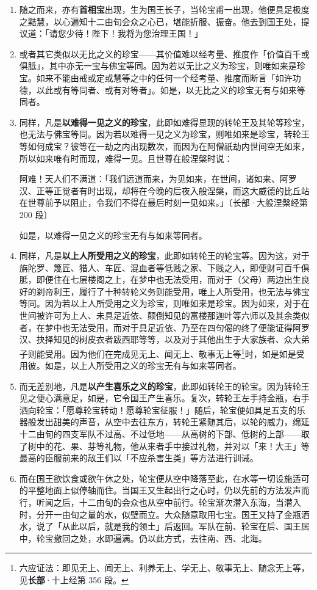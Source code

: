 \begin{enumerate}
\item 随之而来，亦有\textbf{首相宝}出现，生为国王长子，当轮宝甫一出现，他便具足极度之黠慧，以心遍知十二由旬会众之心已，堪能折服、振奋。他去到国王处，提议道：「请您少待！陛下！我将为您治理王国！」
\item 或者其它类似以无比之义的珍宝——其价值难以经考量、推度作「价值百千或俱胝」，其中亦无一宝与佛宝等同。因为若以无比之义为珍宝，则唯如来是珍宝。如来不能由戒或定或慧等之中的任何一个经考量、推度而断言「如许功德，以此或有等同者、或有对等者」。如是，以无比之义的珍宝无有与如来等同者。
\item 同样，凡是\textbf{以难得一见之义的珍宝}，此即如难得显现的转轮王及其轮等珍宝，也无法与佛宝等同。因为若以难得一见之义为珍宝，则唯如来是珍宝，转轮王等如何成宝？彼等在一劫之内出现数次，而因为在阿僧祇劫内世间空无如来，所以如来唯有时而现，难得一见。且世尊在般涅槃时说：\begin{quoting}阿难！天人们不满道：「我们远道而来，为见如来，在世间，诸如来、阿罗汉、正等正觉者有时出现，却将在今晚的后夜入般涅槃，而这大威德的比丘站在世尊前予以阻止，令我们不得在最后时刻一见如来。」{\bluefootnotesize 〔长部·大般涅槃经第 200 段〕}\end{quoting}如是，以难得一见之义的珍宝无有与如来等同者。
\item 同样，凡是\textbf{以上人所受用之义的珍宝}，此即如转轮王的轮宝等。因为这，对于旃陀罗、篾匠、猎人、车匠、混血者等低贱之家、下贱之人，即便财可百千俱胝，即便住在七层楼阁之上，在梦中也无法受用，而对于（父母）两边出生良好的刹帝利王，履行了十种转轮义务则能受用，唯上人所受用，也无法与佛宝等同。因为若以上人所受用之义为珍宝，则唯如来是珍宝。因为如来，对于在世间被许可为上人、未具足近依、颠倒知见的富楼那迦叶等六师以及其余类似者，在梦中也无法受用，而对于具足近依、乃至在四句偈的终了便能证得阿罗汉、抉择知见的树皮衣者跋西耶等等，以及对于其他出生于大家族者、众大弟子则能受用。因为他们在完成见无上、闻无上、敬事无上等\footnote{六应证法：即见无上、闻无上、利养无上、学无上、敬事无上、随念无上等，见\textbf{长部}·十上经第 356 段。}时，如是如是受用彼。如是，以上人所受用之义的珍宝无有与如来等同者。
\item 而无差别地，凡是\textbf{以产生喜乐之义的珍宝}，此即如转轮王的轮宝。因为转轮王见之便心满意足，如是，它令国王产生喜乐。复次，转轮王左手持金瓶，右手洒向轮宝：「愿尊轮宝转动！愿尊轮宝征服！」随后，轮宝便如具足五支的乐器般发出甜美的声音，从空中去往东方，转轮王紧随其后，以轮的威力，绵延十二由旬的四支军队不过高、不过低地——从高树的下部、低树的上部——取了树中的花、果、芽等礼物，他从来者手中接过礼物，并对以「来！大王」等最高的臣服前来的敌王们以「不应杀害生类」等方法进行训诫。
\item 而在国王欲饮食或欲午休之处，轮宝便从空中降落至此，在水等一切设施适可的平整地面上似停轴而住。当国王又生起出行之心时，仍以先前的方法发声而行，听闻之后，十二由旬的会众也从空中前行。轮宝渐次潜入东海，当潜入时，分开一由旬之量的水，似壁而立。大众随意取用七宝。国王又持了金瓶洒水，说了「从此以后，就是我的领土」后返回。军队在前、轮宝在后、国王居中，轮宝撤回之处，水即遍满。仍以此方式，去往南、西、北海。

\end{enumerate}
